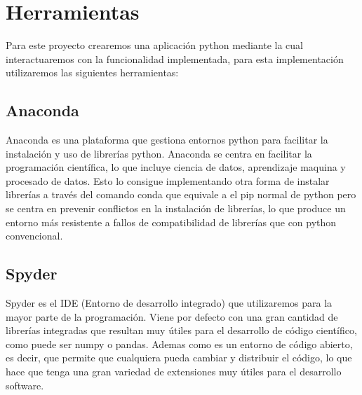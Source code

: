 \documentclass[12pt,a4paper]{article}
\begin{document}
	\vspace{1cm}
	\section{Herramientas}
	\vspace{1cm}
Para este proyecto crearemos una aplicación python mediante la cual interactuaremos con la funcionalidad implementada, para esta implementación utilizaremos las siguientes herramientas:\\
\subsection{Anaconda}
Anaconda es una plataforma que gestiona entornos python para facilitar la instalación y uso de librerías python. Anaconda se centra en facilitar la programación científica, lo que incluye ciencia de datos, aprendizaje maquina y procesado de datos. Esto lo consigue implementando otra forma de instalar librerías a través del comando conda que equivale a el pip normal de python pero se centra en prevenir conflictos en la instalación de librerías, lo que produce un entorno más resistente a fallos de compatibilidad de librerías que con python convencional.\\
\subsection{Spyder}
Spyder es el IDE (Entorno de desarrollo integrado) que utilizaremos para la mayor parte de la programación. Viene por defecto con una gran cantidad de librerías integradas que resultan muy útiles para el desarrollo de código científico, como puede ser numpy o pandas. Ademas como es un entorno de código abierto, es decir, que permite que cualquiera pueda cambiar y distribuir el código, lo que hace que tenga una gran variedad de extensiones muy útiles para el desarrollo software.\\
\end{document}
